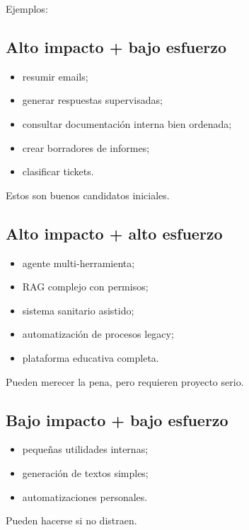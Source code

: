 Ejemplos:

\subsection{Alto impacto + bajo
esfuerzo}\label{alto-impacto-bajo-esfuerzo}

\begin{itemize}
\tightlist
\item
  resumir emails;
\item
  generar respuestas supervisadas;
\item
  consultar documentación interna bien ordenada;
\item
  crear borradores de informes;
\item
  clasificar tickets.
\end{itemize}

Estos son buenos candidatos iniciales.

\subsection{Alto impacto + alto
esfuerzo}\label{alto-impacto-alto-esfuerzo}

\begin{itemize}
\tightlist
\item
  agente multi-herramienta;
\item
  RAG complejo con permisos;
\item
  sistema sanitario asistido;
\item
  automatización de procesos legacy;
\item
  plataforma educativa completa.
\end{itemize}

Pueden merecer la pena, pero requieren proyecto serio.

\subsection{Bajo impacto + bajo
esfuerzo}\label{bajo-impacto-bajo-esfuerzo}

\begin{itemize}
\tightlist
\item
  pequeñas utilidades internas;
\item
  generación de textos simples;
\item
  automatizaciones personales.
\end{itemize}

Pueden hacerse si no distraen.

